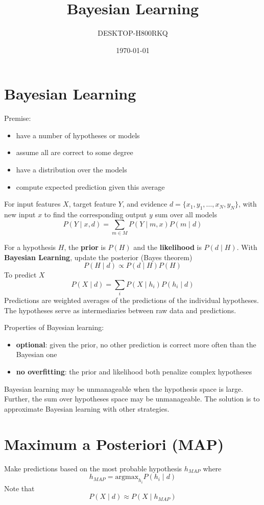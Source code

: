\documentclass[11pt]{article}
\author{DESKTOP-H800RKQ}
\date{\today}
\title{Bayesian Learning}
\begin{document}
\maketitle
\tableofcontents

\section{Bayesian Learning}
\label{sec:orga6cdddc}
Premise:
\begin{itemize}
\item have a number of hypotheses or models
\item assume all are correct to some degree
\item have a distribution over the models
\item compute expected prediction given this average
\end{itemize}

For input features \(X\), target feature \(Y\), and evidence
\(d = \{ x_{1}, y_{1}, \dots, x_{N}, y_{N} \}\), with new input \(x\)
to find the corresponding output \(y\) sum over all models
$$ P(Y \mid x, d) = \sum_{m \in M} P(Y \mid m, x) P(m \mid d) $$

For a hypothesis \(H\), the \textbf{prior} is \(P(H)\) and the \textbf{likelihood} is
\(P(d \mid H)\).
With \textbf{Bayesian Learning}, update the posterior (Bayes theorem)
$$ P(H \mid d) \propto P(d \mid H) P(H) $$
To predict \(X\)
$$ P(X \mid d) = \sum_{i} P(X \mid h_{i}) P(h_{i} \mid d) $$
Predictions are weighted averages of the predictions of the individual hypotheses.
The hypotheses serve as intermediaries between raw data and predictions.

Properties of Bayesian learning:
\begin{itemize}
\item \textbf{optional}: given the prior, no other prediction is correct more often than
the Bayesian one
\item \textbf{no overfitting}: the prior and likelihood both penalize complex hypotheses
\end{itemize}

Bayesian learning may be unmanageable when the hypothesis space is large.
Further, the sum over hypotheses space may be unmanageable.
The solution is to approximate Bayesian learning with other strategies.
\section{Maximum a Posteriori (MAP)}
\label{sec:org500001b}
Make predictions based on the most probable hypothesis \(h_{MAP}\)
where
$$ h_{MAP} = \text{argmax}_{h_{i}} P(h_{i} \mid d) $$
Note that
$$ P(X \mid d) \approx P(X \mid h_{MAP}) $$
\end{document}
